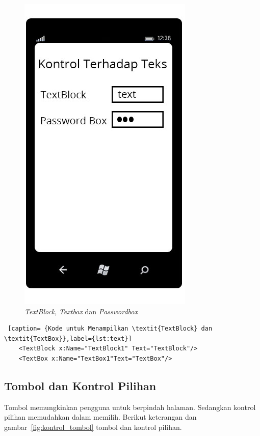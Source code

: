 \begin{figure}[h]
	\centering
		\includegraphics[scale=0.5]{Gambar/Tombol/kontrol_teks}
	\caption{\textit{TextBlock}, \textit{Textbox} dan \textit{Passwordbox}}
	\label{fig:kontrol_teks}
\end{figure}

\begin{lstlisting} [caption= {Kode untuk Menampilkan \textit{TextBlock} dan \textit{TextBox}},label={lst:text}]
	<TextBlock x:Name="TextBlock1" Text="TextBlock"/>
	<TextBox x:Name="TextBox1"Text="TextBox"/>
\end{lstlisting}

\subsection{Tombol dan Kontrol Pilihan \cite{MSDN}}
\label{subsubsec:Tombol dan Kontrol Pilihan}
\hspace{0.5cm} Tombol memungkinkan pengguna untuk berpindah halaman. Sedangkan kontrol pilihan memudahkan dalam memilih. Berikut keterangan dan gambar~\ref{fig:kontrol_tombol} tombol dan kontrol pilihan.
 

